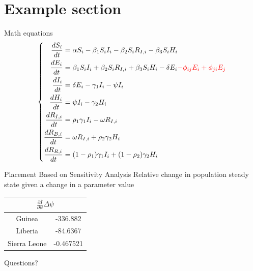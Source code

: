 \documentclass{beamer}
\begin{document}
\section{Example section}
\begin{frame}{Math equations}
\begin{equation*} \left\lbrace
\begin{aligned}
\frac{dS_i}{dt} &= \alpha S_i - \beta_1 S_i I_i -\beta_2 S_i R_{I,i}
-\beta_3S_iH_i\\
\frac{dE_i}{dt} &=  \beta_1 S_i I_i +\beta_2 S_i R_{I,i} +\beta_3S_iH_i-
\delta E_i {\color{red} - \phi_{ij}E_i + \phi_{ji} E_j}\\
\frac{dI_i}{dt} &=  \delta E_i - \gamma_1 I_i-\psi I_i\\
\frac{dH_i}{dt} &= \psi I_i - \gamma_2 H_i \\
\frac{dR_{I,i}}{dt} &= \rho_1\gamma_1 I_i - \omega R_{I,i} \\
\frac{dR_{B,i}}{dt} &= \omega R_{I,i}+\rho_2\gamma_2 H_i \\
\frac{dR_{R,i}}{dt} &= (1-\rho_1)\gamma_1
I_i+(1-\rho_2)\gamma_2 H_i \\%
\end{aligned} \label{std_seir}
\right.
\end{equation*}
\end{frame}

\begin{frame}{Placement Based on Sensitivity Analysis}
Relative change in population steady state given a change in a parameter value
\begin{center}
\begin{tabular}{|c|c|}
\hline
\multicolumn{2}{|c|}{$\displaystyle\frac{\partial \bar{I}}{\partial \psi}\Delta
\psi$} \\
\hline
Guinea & -336.882 \\ \hline
Liberia & -84.6367 \\ \hline
Sierra Leone & -0.467521 \\ \hline
\end{tabular}
\end{center}
\end{frame}

{
\begin{frame}
\centering \Huge \color{white} Questions?

\end{frame}}
\end{document}
